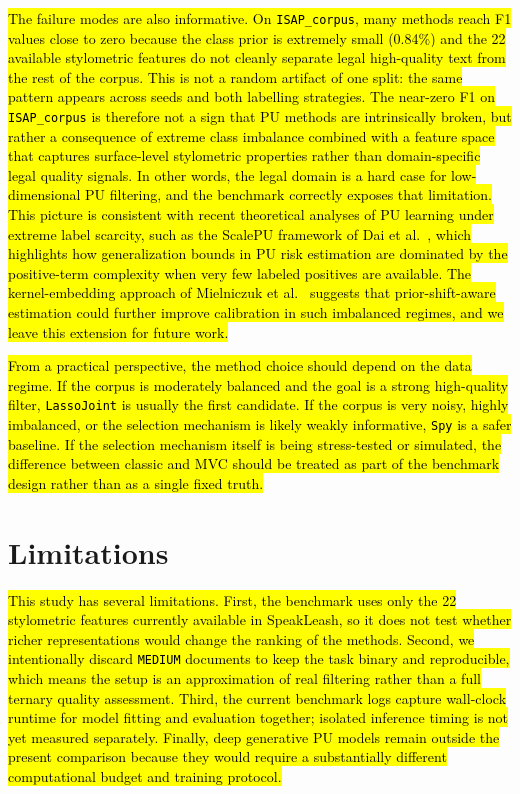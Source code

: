 \documentclass[applsci,article,submit,pdftex,moreauthors]{Definitions/mdpi}
\newcommand{\rev}[1]{\hl{#1}}
\begin{document}
\rev{The failure modes are also informative. On \texttt{ISAP\_corpus}, many methods reach F1 values close to zero because the class prior is extremely small (0.84\%) and the 22 available stylometric features do not cleanly separate legal high-quality text from the rest of the corpus. This is not a random artifact of one split: the same pattern appears across seeds and both labelling strategies. The near-zero F1 on \texttt{ISAP\_corpus} is therefore not a sign that PU methods are intrinsically broken, but rather a consequence of extreme class imbalance combined with a feature space that captures surface-level stylometric properties rather than domain-specific legal quality signals. In other words, the legal domain is a hard case for low-dimensional PU filtering, and the benchmark correctly exposes that limitation. This picture is consistent with recent theoretical analyses of PU learning under extreme label scarcity, such as the ScalePU framework of Dai et al.~\cite{dai2026scalepu}, which highlights how generalization bounds in PU risk estimation are dominated by the positive-term complexity when very few labeled positives are available. The kernel-embedding approach of Mielniczuk et al.~\cite{mielniczuk2026priorshift} suggests that prior-shift-aware estimation could further improve calibration in such imbalanced regimes, and we leave this extension for future work.}

\rev{From a practical perspective, the method choice should depend on the data regime. If the corpus is moderately balanced and the goal is a strong high-quality filter, \texttt{LassoJoint} is usually the first candidate. If the corpus is very noisy, highly imbalanced, or the selection mechanism is likely weakly informative, \texttt{Spy} is a safer baseline. If the selection mechanism itself is being stress-tested or simulated, the difference between classic and MVC should be treated as part of the benchmark design rather than as a single fixed truth.}

\section{Limitations}
\label{sec:limitations}

\rev{This study has several limitations. First, the benchmark uses only the 22 stylometric features currently available in SpeakLeash, so it does not test whether richer representations would change the ranking of the methods. Second, we intentionally discard \texttt{MEDIUM} documents to keep the task binary and reproducible, which means the setup is an approximation of real filtering rather than a full ternary quality assessment. Third, the current benchmark logs capture wall-clock runtime for model fitting and evaluation together; isolated inference timing is not yet measured separately. Finally, deep generative PU models remain outside the present comparison because they would require a substantially different computational budget and training protocol.}
\end{document}
